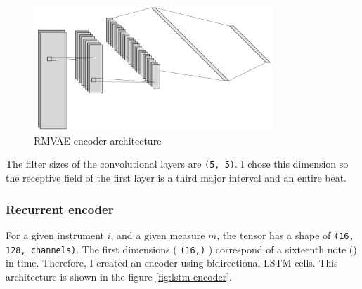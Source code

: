 \documentclass[12pt]{report}
\begin{document}
\begin{figure}[h]
    \centering
    \includegraphics[width=0.8\textwidth]{images/nn/architectures/rmvae/encoder.jpg}
    \caption{RMVAE encoder architecture}
    \label{fig:rmvae_encoder}
\end{figure}

The filter sizes of the convolutional layers are \texttt{(5, 5)}.
I chose this dimension so the receptive field of the first layer is a third major interval and an entire beat.

\subsubsection{Recurrent encoder}
\label{sec:encoder:rnn}

For a given instrument $i$, and a given measure $m$, the tensor has a shape of \texttt{(16, 128, channels)}.
The first dimensions ( \texttt{(16,)} ) correspond of a sixteenth note (\musSixteenth) in time.
Therefore, I created an encoder using bidirectional LSTM cells.
This architecture is shown in the figure \ref{fig:lstm-encoder}.
\end{document}
